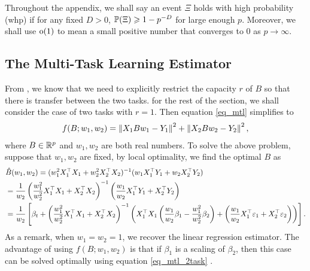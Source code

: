 Throughout the appendix, we shall say an event $\Xi$ holds with high probability (whp) if for any fixed $D>0$, $\P(\Xi)\ge 1- p^{-D}$ for large enough $p$. Moreover, we shall use $\oo(1)$ to mean a small positive number that converges to 0 as $p\to \infty$.


\subsection{The Multi-Task Learning Estimator}\label{sec_MTLest}
From \cite{WZR20}, we know that we need to explicitly restrict the capacity $r$ of $B$ so that there is transfer between the two tasks.
for the rest of the section, we shall consider the case of two tasks with $r=1$. 
Then equation \eqref{eq_mtl} simplifies to 
\begin{align}\label{eq_mtl_2task}
	f(B; w_1, w_2) = \bignorm{X_1 B w_1 - Y_1}^2 + \bignorm{X_2 B w_2 - Y_2}^2,
\end{align}
where $B\in\real^p$ and $w_1, w_2$ are both real numbers. To solve the above problem, suppose that $w_1, w_2$ are fixed, by local optimality, we find the optimal $B$ as
\begin{align}
	& \hat{B}(w_1, w_2) = (w_1^2 X_1^{\top}X_1 + w_2^2 X_2^{\top}X_2)^{-1} (w_1 X_1^{\top}Y_1 + w_2 X_2^{\top}Y_2) \label{hatB}\\
	&= \frac{1}{w_2} \left( \frac{w_1^2}{w_2^2}  X_1^{\top}X_1 + X_2^{\top}X_2\right)^{-1} \left(\frac{w_1}{w_2} X_1^{\top}Y_1 + X_2^{\top}Y_2\right) \nonumber\\
	&= \frac{1}{w_2}\left[\beta_t + \left(\frac{w_1^2}{w_2^2} X_1^{\top}X_1 + X_2^{\top}X_2\right)^{-1}\bigbrace{X_1^{\top}X_1\left(\frac{w_1}{w_2}\beta_1 - \frac{w_1^2}{w_2^2} \beta_2\right) + \left(\frac{w_1}{w_2} X_1^{\top}\varepsilon_1 + X_2^{\top}\varepsilon_2\right)}\right]. \nonumber
\end{align}
As a remark, when $w_1 = w_2 = 1$, we recover the linear regression estimator.
The advantage of using $f(B; w_1, w_2)$ is that if $\beta_1$ is a scaling of $\beta_2$, then this case can be solved optimally using equation \eqref{eq_mtl_2task} \cite{KD12}.


